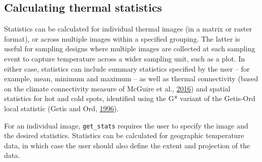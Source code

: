 \documentclass[12pt,british,a4paper,]{article}
\newenvironment{Shaded}{\begin{snugshade}}{\end{snugshade}}
\newcommand{\DataTypeTok}[1]{\textcolor[rgb]{0.13,0.29,0.53}{#1}}
\newcommand{\StringTok}[1]{\textcolor[rgb]{0.31,0.60,0.02}{#1}}
\newcommand{\CommentTok}[1]{\textcolor[rgb]{0.56,0.35,0.01}{\textit{#1}}}
\newcommand{\OtherTok}[1]{\textcolor[rgb]{0.56,0.35,0.01}{#1}}
\newcommand{\OperatorTok}[1]{\textcolor[rgb]{0.81,0.36,0.00}{\textbf{#1}}}
\newcommand{\NormalTok}[1]{#1}
\theoremstyle{definition}
\theoremstyle{definition}
\theoremstyle{definition}
\theoremstyle{remark}
\begin{document}
\begin{Shaded}
\end{Shaded}

\subsection{Calculating thermal
statistics}\label{calculating-thermal-statistics}

Statistics can be calculated for individual thermal images (in a matrix
or raster format), or across multiple images within a specified
grouping. The latter is useful for sampling designs where multiple
images are collected at each sampling event to capture temperature
across a wider sampling unit, such as a plot. In either case, statistics
can include summary statistics specified by the user -- for example,
mean, minimum and maximum -- as well as thermal connectivity (based on
the climate connectivity measure of McGuire et al.,
\protect\hyperlink{ref-mcguire_achieving_2016}{2016}) and spatial
statistics for hot and cold spots, identified using the G* variant of
the Getis-Ord local statistic (Getis and Ord,
\protect\hyperlink{ref-getis_local_1996}{1996}).

For an individual image, \texttt{get\_stats} requires the user to
specify the image and the desired statistics. Statistics can be
calculated for geographic temperature data, in which case the user
should also define the extent and projection of the data.
\end{document}
